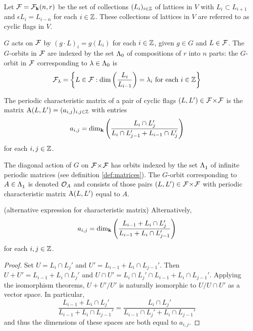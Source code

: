 \documentclass[a4paper, 11pt]{report}
\begin{document}
Let $\mathcal{F}=\mathcal{F}_{\mathbf{k}}(n,r)$ be the set of collections $(L_i)_{i\in\mathbb{Z}}$ of lattices in $V$ with $L_i\subset L_{i+1}$ and $\epsilon L_i = L_{i-n}$ for each $i\in\mathbb{Z}$. These collections of lattices in $V$ are referred to as cyclic flags in $V$. 

$G$ acts on $\mathcal{F}$ by $(g\cdot L)_i = g(L_i)$ for each $i\in\mathbb{Z}$, given $g\in G$ and $L\in\mathcal{F}$. The $G$-orbits in $\mathcal{F}$ are indexed by the set ${\Lambda_0}$ of compositions of $r$ into $n$ parts: the $G$-orbit in $\mathcal{F}$ corresponding to $\lambda\in{\Lambda_0}$ is
\begin{equation*}
\mathcal{F}_\lambda = \left\{L\in\mathcal{F}: \dim\left(\frac{L_i}{L_{i-1}}\right) = \lambda_i \text{ for each } i\in\mathbb{Z}\right\}
\end{equation*}

\begin{definition}\label{def:characteristic-matrix}
The periodic characteristic matrix of a pair of cyclic flags $(L,L')\in{\mathcal{F}\!\times\!\mathcal{F}}$ is the matrix $\operatorname{A}(L,L')=(a_{i,j})_{i,j\in\mathbb{Z}}$ with entries
\begin{equation*}
a_{i,j} = \dim_{\mathbf{k}}\left(\frac{L_i\cap L_j'}{L_i\cap L_{j-1}' + L_{i-1}\cap L_j'}\right)
\end{equation*}
for each $i,j\in\mathbb{Z}$.
\end{definition}

The diagonal action of $G$ on ${\mathcal{F}\!\times\!\mathcal{F}}$ has orbits indexed by the set $\Lambda_1^{}$ of infinite periodic matrices (see definition \ref{def:matrices}). The $G$-orbit corresponding to $A\in\Lambda_1^{}$ is denoted $\mathcal{O}_{A}$ and consists of those pairs $(L,L')\in{\mathcal{F}\!\times\!\mathcal{F}}$ with periodic characteristic matrix $\operatorname{A}(L,L')$ equal to $A$.

\begin{lemma}(alternative expression for characteristic matrix)
Alternatively,
\begin{equation*}
a_{i,j} = \dim_{\mathbf{k}}\left(\frac{L_{i-1} + L_i\cap L_j'}{L_{i-1} + L_i\cap L_{j-1}'}\right)
\end{equation*}
for each $i,j\in\mathbb{Z}$.
\end{lemma}
\begin{proof}
Set $U=L_i\cap L_j'$ and $U'=L_{i-1}+L_i\cap L_{j-1}'$. Then $U+U'=L_{i-1}+L_i\cap L_j'$ and $U\cap U'= L_i\cap L_j'\cap L_{i-1} + L_i\cap L_{j-1}'$. Applying the isomorphism theorems, ${U+U'}/{U'}$ is naturally isomorphic to $U/{U\cap U'}$ as a vector space. In particular,
\begin{equation*}
\frac{L_{i-1}+L_i\cap L_j'}{L_{i-1} + L_i\cap L_{j-1}'} = \frac{L_i\cap L_j'}{L_{i-1}\cap L_j' + L_i\cap L_{j-1}'}
\end{equation*}
and thus the dimensions of these spaces are both equal to $a_{i,j}$.
\end{proof}
\end{document}
